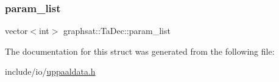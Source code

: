 \subsubsection{\texorpdfstring{param\_list}{param\_list}}
{\footnotesize\ttfamily vector$<$int$>$ graphsat\+::\+Ta\+Dec\+::param\+\_\+list}



The documentation for this struct was generated from the following file\+:\begin{DoxyCompactItemize}
\item 
include/io/\mbox{\hyperlink{uppaaldata_8h}{uppaaldata.\+h}}\end{DoxyCompactItemize}
